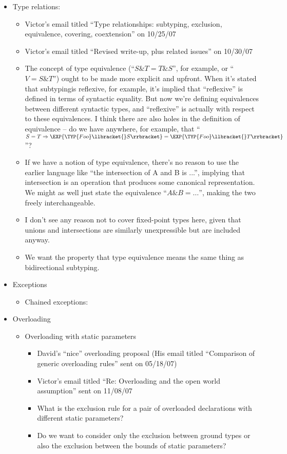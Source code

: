 \begin{itemize}
\item Type relations:
 \begin{itemize}
 \item Victor's email titled ``Type relationships: subtyping, exclusion, equivalence, covering, coextension'' on 10/25/07
 \item Victor's email titled ``Revised write-up, plus related issues'' on 10/30/07
 \item
The concept of type equivalence (``$S \& T = T \& S$'', for example, or
``$V = S \& T$'') ought to be made more explicit and upfront.
When it's stated that subtypingis reflexive, for example, it's implied that
``reflexive'' is defined in terms of syntactic equality.
 But now we're defining equivalences between different syntactic types,
and ``reflexive'' is actually with respect to these equivalences.  I think
there are also holes in the definition of equivalence -- do we have anywhere,
for example, that ``$S = T \Rightarrow
\EXP{\TYP{Foo}\llbracket{}S\rrbracket} = \EXP{\TYP{Foo}\llbracket{}T\rrbracket}$''?
 \item
If we have a notion of type equivalence, there's no reason to use the earlier
language like ``the intersection of A and B is ...'', implying that
intersection is an operation that produces some canonical representation.
We might as well just state the equivalence ``$A \& B = \dots$'',
making the two freely interchangeable.
 \item
I don't see any reason not to cover fixed-point types here, given that unions
and intersections are similarly unexpressible but are included anyway.
  \item We want the property that type equivalence means the same thing as bidirectional subtyping.
 \end{itemize}

\item Exceptions
\begin{itemize}
\item Chained exceptions: 
\end{itemize}

\item Overloading
\begin{itemize}
\item Overloading with static parameters
\begin{itemize}
\item David's ``nice'' overloading proposal (His email titled ``Comparison of generic overloading rules'' sent on 05/18/07)
\item Victor's email titled ``Re: Overloading and the open world assumption''
sent on 11/08/07
\item What is the exclusion rule for a pair of overloaded declarations with different static parameters?
\item Do we want to consider only the exclusion between ground types or also the exclusion between the bounds of static parameters?


\end{itemize}
\end{itemize}
\end{itemize}
